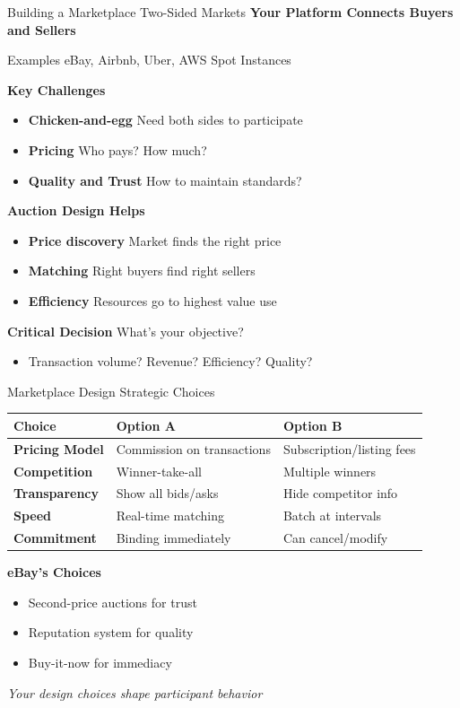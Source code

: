\documentclass[xcolor={x11names}]{beamer}
\begin{document}
\begin{frame}{Building a Marketplace Two-Sided Markets}
\textbf{Your Platform Connects Buyers and Sellers}

Examples eBay, Airbnb, Uber, AWS Spot Instances


\textbf{Key Challenges}
\begin{itemize}
  \item \textbf{Chicken-and-egg} Need both sides to participate
  \item \textbf{Pricing} Who pays? How much?
  \item \textbf{Quality and Trust} How to maintain standards?
\end{itemize}


\textbf{Auction Design Helps}
\begin{itemize}
  \item \textbf{Price discovery} Market finds the right price
  \item \textbf{Matching} Right buyers find right sellers
  \item \textbf{Efficiency} Resources go to highest value use
\end{itemize}


\textbf{Critical Decision} What's your objective?
\begin{itemize}
  \item Transaction volume? Revenue? Efficiency? Quality?
\end{itemize}
\end{frame}

\begin{frame}{Marketplace Design Strategic Choices}
\begin{center}
\begin{tabular}{|p{2.8cm}|p{2.8cm}|p{2.8cm}|}
\hline
\textbf{Choice} & \textbf{Option A} & \textbf{Option B} \\
\hline
\textbf{Pricing Model} & 
Commission on transactions &
Subscription/listing fees \\
\hline
\textbf{Competition} & 
Winner-take-all &
Multiple winners \\
\hline
\textbf{Transparency} & 
Show all bids/asks &
Hide competitor info \\
\hline
\textbf{Speed} & 
Real-time matching &
Batch at intervals \\
\hline
\textbf{Commitment} & 
Binding immediately &
Can cancel/modify \\
\hline
\end{tabular}
\end{center}


\textbf{eBay's Choices}
\begin{itemize}
  \item Second-price auctions for trust
  \item Reputation system for quality
  \item Buy-it-now for immediacy
\end{itemize}
\textit{Your design choices shape participant behavior}
\end{frame}
\end{document}
